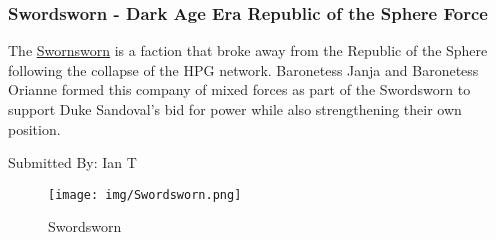 \subsubsection{Swordsworn - Dark Age Era Republic of the Sphere Force}

The \href{https://www.sarna.net/wiki/Swordsworn}{Swornsworn} is a faction that broke away from the Republic of the Sphere following the collapse of the HPG network.
Baronetess Janja and Baronetess Orianne formed this company of mixed forces as part of the Swordsworn to support Duke Sandoval's bid for power while also strengthening their own position.

Submitted By: Ian T

\begin{figure}[!h]
  \centering
  \texttt{[image: img/Swordsworn.png]}
  \caption*{Swordsworn}
\end{figure}

